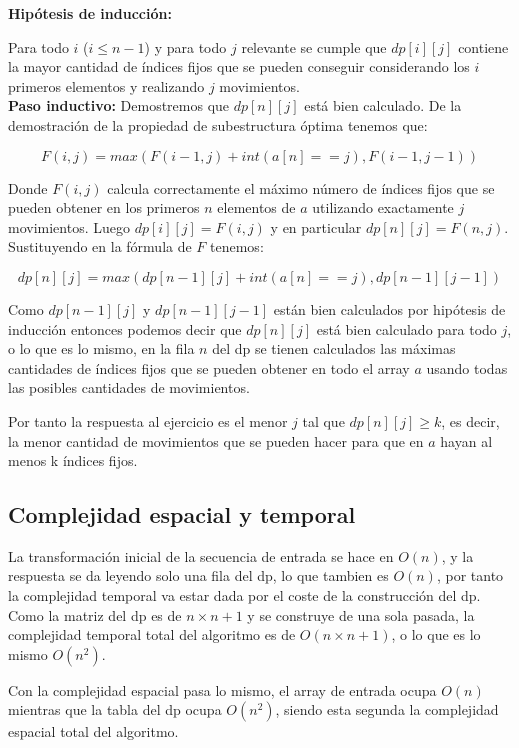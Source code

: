 \documentclass[11pt]{article}
\begin{document}
    \textbf{Hipótesis de inducción:}

    Para todo $i$ ($i \leq n-1$) y para todo $j$ relevante se cumple que $dp[i][j]$ contiene la mayor cantidad
    de índices fijos que se pueden conseguir considerando los $i$ primeros elementos y realizando $j$ movimientos.\\[10pt]

    \textbf{Paso inductivo:}
    Demostremos que $dp[n][j]$ está bien calculado. De la demostración de la propiedad de subestructura óptima
    tenemos que:

    \[
    F(i, j) = max(F(i-1, j) + int(a[n] == j), F(i-1, j-1))
    \]

    Donde $F(i, j)$ calcula correctamente el máximo número de índices fijos que se pueden obtener en los 
    primeros $n$ elementos de $a$ utilizando exactamente $j$ movimientos. Luego $dp[i][j] = F(i, j)$ y en 
    particular $dp[n][j] = F(n, j)$. Sustituyendo en la fórmula de $F$ tenemos:

    \[
    dp[n][j] = max(dp[n-1][j] + int(a[n] == j), dp[n-1][j-1])
    \]

    Como $dp[n-1][j]$ y $dp[n-1][j-1]$ están bien calculados por hipótesis de inducción entonces podemos
    decir que $dp[n][j]$ está bien calculado para todo $j$, o lo que es lo mismo, en la fila $n$ del dp se
    tienen calculados las máximas cantidades de índices fijos que se pueden obtener en todo el array $a$ 
    usando todas las posibles cantidades de movimientos.

    Por tanto la respuesta al ejercicio es el menor $j$ tal que $dp[n][j] \geq k$, es decir, la menor cantidad
    de movimientos que se pueden hacer para que en $a$ hayan al menos k índices fijos.

    \subsection{Complejidad espacial y temporal}
    La transformación inicial de la secuencia de entrada se hace en $O(n)$, y la respuesta se da leyendo solo
    una fila del dp, lo que tambien es $O(n)$, por tanto la complejidad temporal va estar dada por el coste
    de la construcción del dp. Como la matriz del dp es de $n \times n + 1$ y se construye de una sola pasada,
    la complejidad temporal total del algoritmo es de $O(n \times n+1)$, o lo que es lo mismo $O(n^2)$.

    Con la complejidad espacial pasa lo mismo, el array de entrada ocupa $O(n)$ mientras que la tabla del dp ocupa
    $O(n^2)$, siendo esta segunda la complejidad espacial total del algoritmo.
\end{document}
